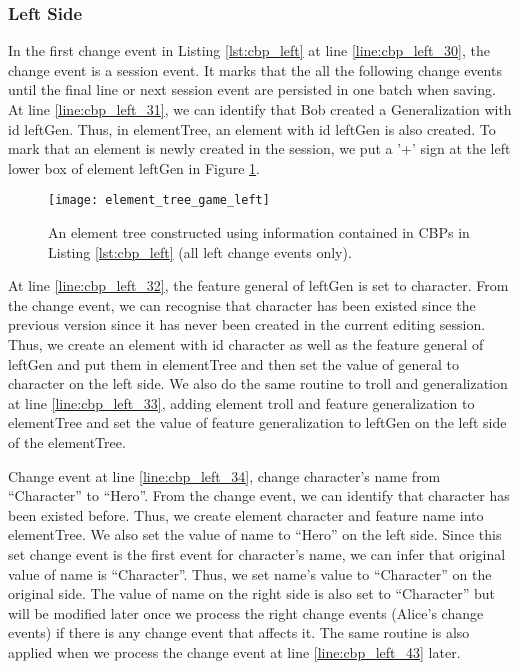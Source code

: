 \subsubsection{Left Side}\label{sec:left_side}
In the first change event in Listing \ref{lst:cbp_left} at line \ref{line:cbp_left_30}, the change event is a \textsf{session} event. It marks that the all the following change events until the final line or next \textsf{session} event are persisted in one batch when saving. At line \ref{line:cbp_left_31}, we can identify that Bob created a \textsf{Generalization} with id \textsf{leftGen}. Thus, in \textsf{elementTree}, an element with id \textsf{leftGen} is also created. To mark that an element is newly created in the session, we put a '+' sign at the left lower box of element \textsf{leftGen} in Figure \ref{fig:left_element_tree_diagram}.

\begin{figure}[ht]
  \centering
  \texttt{[image: element\_tree\_game\_left]}
  \caption{An element tree constructed using information contained in CBPs in Listing \ref{lst:cbp_left} (all left change events only).}
  \label{fig:left_element_tree_diagram}
\end{figure} 

At line \ref{line:cbp_left_32}, the feature \textsf{general} of \textsf{leftGen} is set to \textsf{character}. From the change event, we can recognise that \textsf{character} has been existed since the previous version since it has never been created in the current editing session. Thus, we create an element with id \textsf{character} as well as the feature \textsf{general} of \textsf{leftGen} and put them in \textsf{elementTree} and then set the value of \textsf{general} to \textsf{character} on the left side. We also do the same routine to \textsf{troll} and \textsf{generalization} at line \ref{line:cbp_left_33}, adding element \textsf{troll} and feature \textsf{generalization} to \textsf{elementTree} and set the value of feature \textsf{generalization} to \textsf{leftGen} on the left side of the \textsf{elementTree}. 

Change event at line \ref{line:cbp_left_34}, change \textsf{character}'s \textsf{name} from ``Character'' to ``Hero''. From the change event, we can identify that \textsf{character} has been existed before. Thus, we create element \textsf{character} and feature \textsf{name} into \textsf{elementTree}. We also set the value of \textsf{name} to ``Hero'' on the left side. Since this set change event is the first event for \textsf{character}'s \textsf{name}, we can infer that original value of \textsf{name} is ``Character''. Thus, we set \textsf{name}'s value to ``Character'' on the original side. The value of \textsf{name} on the right side is also set to ``Character'' but will be modified later once we process the right change events (Alice's change events) if there is any change event that affects it. The same routine is also applied when we process the change event at line \ref{line:cbp_left_43} later.

